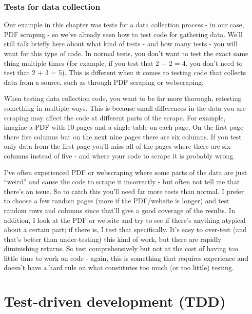 \documentclass[
]{krantz}
\begin{document}
\hypertarget{tests-for-data-collection}{%
\subsubsection{Tests for data
collection}\label{tests-for-data-collection}}

Our example in this chapter was tests for a data collection
process - in our case, PDF scraping - so we've already seen
how to test code for gathering data. We'll still talk
briefly here about what kind of tests - and how many tests -
you will want for this type of code. In normal tests, you
don't want to test the exact same thing multiple times (for
example, if you test that 2 + 2 = 4, you don't need to test
that 2 + 3 = 5). This is different when it comes to testing
code that collects data from a source, such as through PDF
scraping or webscraping.

When testing data collection code, you want to be far more
thorough, retesting something in multiple ways. This is
because small differences in the data you are scraping may
affect the code at different parts of the scrape. For
example, imagine a PDF with 10 pages and a single table on
each page. On the first page there five columns but on the
next nine pages there are six columns. If you test only data
from the first page you'll miss all of the pages where there
are six columns instead of five - and where your code to
scrape it is probably wrong.

I've often experienced PDF or webscraping where some parts
of the data are just ``weird'' and cause the code to scrape
it incorrectly - but often not tell me that there's an
issue. So to catch this you'll need far more tests than
normal. I prefer to choose a few random pages (more if the
PDF/website is longer) and test random rows and columns
since that'll give a good coverage of the results. In
addition, I look at the PDF or website and try to see if
there's anything atypical about a certain part; if there is,
I test that specifically. It's easy to over-test (and that's
better than under-testing) this kind of work, but there are
rapidly diminishing returns. So test comprehensively but not
at the cost of having too little time to work on code -
again, this is something that requires experience and
doesn't have a hard rule on what constitutes too much (or
too little) testing.

\hypertarget{test-driven-development-tdd}{%
\section{Test-driven development
(TDD)}\label{test-driven-development-tdd}}
\end{document}
